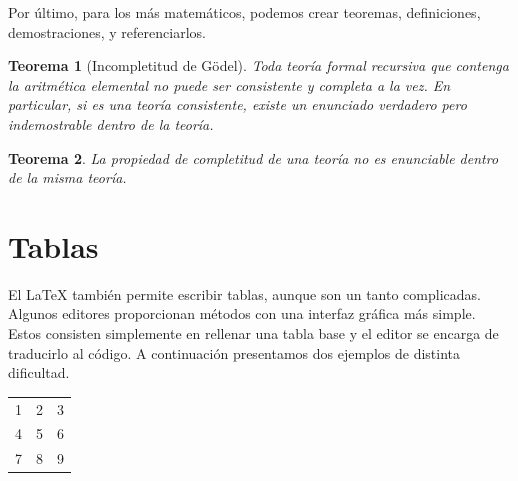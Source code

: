 \documentclass[12pt,a4paper]{article}
\newtheorem{godel}{Teorema}
\begin{document}
Por último, para los más matemáticos, podemos crear teoremas, definiciones, demostraciones, y referenciarlos.

\begin{godel}[Incompletitud de Gödel]
Toda teoría formal recursiva que contenga la aritmética elemental no puede ser consistente y completa a la vez. En particular, si es una teoría consistente, existe un enunciado verdadero pero indemostrable dentro de la teoría.
\end{godel}

\begin{godel}
La propiedad de completitud de una teoría no es enunciable dentro de la misma teoría.
\end{godel}

\clearpage

\section{Tablas}

El \LaTeX{} también permite escribir tablas, aunque son un tanto complicadas. Algunos editores proporcionan métodos con una interfaz gráfica más simple. Estos consisten simplemente en rellenar una tabla base y el editor se encarga de traducirlo al código. A continuación presentamos dos ejemplos de distinta dificultad.
\vspace{5mm}

\begin{center} %
\begin{tabular}{ l | c || r} %
  \hline  %
  1 & 2 & 3 \\ %
  4 & 5 & 6 \\
  7 & 8 & 9 \\
  \hline  
\end{tabular}
\end{center}

\vspace{5mm}
\end{document}
